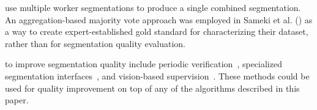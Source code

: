  use multiple worker segmentations to produce a single combined segmentation. %
An aggregation-based majority vote approach was employed in Sameki et al. (\citeyear{Sameki2015}) as a way to create expert-established gold standard for characterizing their dataset, rather than for segmentation quality evaluation. 

 to improve segmentation quality include periodic verification~\cite{Lin2014,Everingham15}, specialized segmentation interfaces~\cite{Song2018}, and vision-based supervision~\cite{Russakovsky2015,Gurari2016}. These methods could be used for quality improvement on top of any of the algorithms described in this paper.  %

